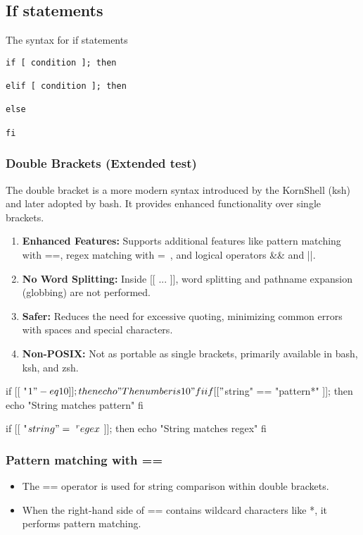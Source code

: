 \documentclass{report}
\begin{document}
    \bigbreak \noindent 
    \subsection{If statements}
    The syntax for if statements
    \bigbreak \noindent 
    
    \begin{verbatim}
if [ condition ]; then 

elif [ condition ]; then

else 

fi
    \end{verbatim}


    \bigbreak \noindent 
    \subsubsection{Double Brackets (Extended test)}
    \bigbreak \noindent 
    The double bracket is a more modern syntax introduced by the KornShell (ksh) and later adopted by bash. It provides enhanced functionality over single brackets.
    \begin{enumerate}
        \item \textbf{Enhanced Features:} Supports additional features like pattern matching with ==, regex matching with =~, and logical operators && and ||.
        \item \textbf{No Word Splitting:} Inside [[ ... ]], word splitting and pathname expansion (globbing) are not performed.
        \item \textbf{Safer:} Reduces the need for excessive quoting, minimizing common errors with spaces and special characters.
        \item \textbf{Non-POSIX:} Not as portable as single brackets, primarily available in bash, ksh, and zsh.

    \end{enumerate}
    \bigbreak \noindent 
    \begin{bashcode}
        if [[ "$1" -eq 10 ]]; then
        echo "The number is 10"
        fi

        if [[ "$string" == "pattern*" ]]; then
        echo "String matches pattern"
        fi

        if [[ "$string" =~ ^regex$ ]]; then
        echo "String matches regex"
        fi
    \end{bashcode}

    \bigbreak \noindent 
    \subsubsection{Pattern matching with ==}
    \bigbreak \noindent 
    \begin{itemize}
        \item The == operator is used for string comparison within double brackets.
        \item When the right-hand side of == contains wildcard characters like *, it performs pattern matching.
    \end{itemize}
    \bigbreak \noindent 
\end{document}
